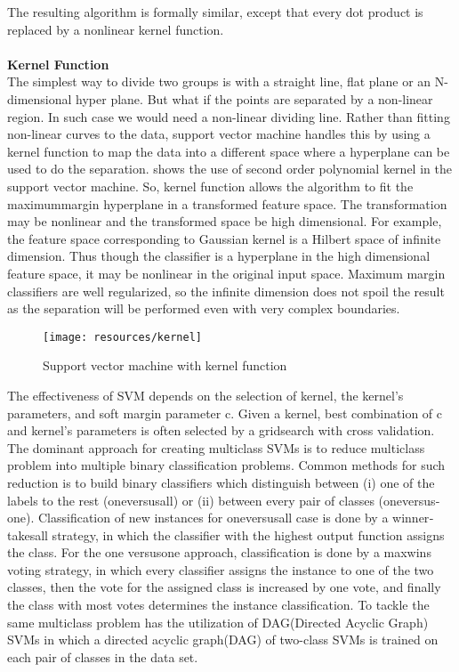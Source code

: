 The resulting algorithm is formally similar, except that every dot product is replaced by a nonlinear kernel 
function.\\
\\
\textbf{Kernel Function}\\
The simplest way to divide two groups is with a straight line, flat plane or an N-dimensional hyper plane.
But what if the points are separated by a non-linear region. In such case we would need a non-linear dividing line. Rather than fitting
non-linear curves to the data, support vector machine handles this by using a kernel function to map the data into a different space where
a hyperplane can be used to do the separation. \cite{Anglade2010} shows the use of second order polynomial kernel in the support vector machine.
So, kernel function allows the algorithm to fit the maximum­margin hyperplane in a transformed
feature space. The transformation may be nonlinear and the transformed space be high dimensional. For example, the 
feature space corresponding to Gaussian kernel is a Hilbert space of infinite dimension. Thus though the 
classifier is a hyperplane in the high dimensional feature space, it may be nonlinear in the original input 
space. Maximum margin classifiers are well regularized, so the infinite dimension does not spoil the 
result as the separation will be performed even with very complex boundaries.\\

\begin{figure}[h!]
        \texttt{[image: resources/kernel]}
        \caption{Support vector machine with kernel function}
\end{figure}
\vspace{15mm}
The effectiveness of SVM depends on the selection of kernel, the kernel’s parameters, and soft 
margin parameter c. Given a kernel, best combination of c and kernel’s parameters is often selected by a 
grid­search with cross validation. 
The dominant approach for creating multiclass SVMs is to reduce multi­class problem into 
multiple binary classification problems. Common methods for such reduction is to build binary classifiers 
which distinguish between (i) one of the labels to the rest (one­versus­all) or (ii) between every pair of 
classes (one­versus­one). Classification of new instances for one­versus­all case is done by a 
winner­takes­all strategy, in which the classifier with the highest output function assigns the class. For the 
one ­versus­one approach, classification is done by a max­wins voting strategy, in which every classifier 
assigns the instance to one of the two classes, then the vote for the assigned class is increased by one vote, 
and finally the class with most votes determines the instance classification. To tackle the same multiclass problem \cite{Haggblade2011} has the  
utilization of DAG(Directed Acyclic Graph) SVMs in which a directed acyclic graph(DAG) of two-class SVMs is trained on each pair of classes in the data set.



